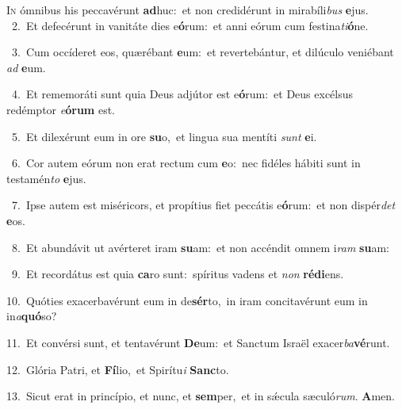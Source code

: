\lettrine{\initial\textcolor{\initialcolor}{I}}{n} ómnibus his peccavérunt \textbf{ad}\-huc:~\star et non credidérunt in mirabíli\textit{bus} \textbf{e}\-jus.\\
{\numbfont\textcolor{\numbcolor}{~2.}}~Et defecérunt in vanitáte dies e\-\textbf{ó}\-rum:~\star et anni eórum cum festina\-\textit{ti}\-\textbf{ó}ne.\par
{\numbfont\textcolor{\numbcolor}{~3.}}~Cum occíderet eos, quærébant \textbf{e}\-um:~\star et revertebántur, et dilúculo veniébant \textit{ad} \textbf{e}\-um.\par
{\numbfont\textcolor{\numbcolor}{~4.}}~Et rememoráti sunt quia Deus adjútor est e\-\textbf{ó}\-rum:~\star et Deus excélsus redémptor \textit{e}\-\textbf{ó}\textbf{rum} est.\par
{\numbfont\textcolor{\numbcolor}{~5.}}~Et dilexérunt eum in ore \textbf{su}\-o,~\star et lingua sua mentíti \textit{sunt} \textbf{e}\-i.\par
{\numbfont\textcolor{\numbcolor}{~6.}}~Cor autem eórum non erat rectum cum \textbf{e}\-o:~\star nec fidéles hábiti sunt in testamén\textit{to} \textbf{e}\-jus.\par
{\numbfont\textcolor{\numbcolor}{~7.}}~Ipse autem est miséricors, et propítius fiet peccátis e\-\textbf{ó}\-rum:~\star et non dispér\textit{det} \textbf{e}\-os.\par
{\numbfont\textcolor{\numbcolor}{~8.}}~Et abundávit ut avérteret iram \textbf{su}\-am:~\star et non accéndit omnem i\textit{ram} \textbf{su}\-am:\par
{\numbfont\textcolor{\numbcolor}{~9.}}~Et recordátus est quia \textbf{ca}\-ro sunt:~\star spíritus vadens et \textit{non} \textbf{réd}\-\textbf{i}ens.\par
{\numbfont\textcolor{\numbcolor}{10.}}~Quóties exacerbavérunt eum in de\-\textbf{sér}\-to,~\star in iram concitavérunt eum in in\-\textit{a}\-\textbf{quó}so?\par
{\numbfont\textcolor{\numbcolor}{11.}}~Et convérsi sunt, et tentavérunt \textbf{De}\-um:~\star et Sanctum Israël exacer\-\textit{ba}\-\textbf{vé}runt.\par
{\numbfont\textcolor{\numbcolor}{12.}}~Glória Patri, et \textbf{Fí}\-lio,~\star et Spirítu\textit{i} \textbf{Sanc}\-to.\par
{\numbfont\textcolor{\numbcolor}{13.}}~Sicut erat in princípio, et nunc, et \textbf{sem}\-per,~\star et in sǽcula sæculó\-\textit{rum}\-. \textbf{A}\-men.\par
